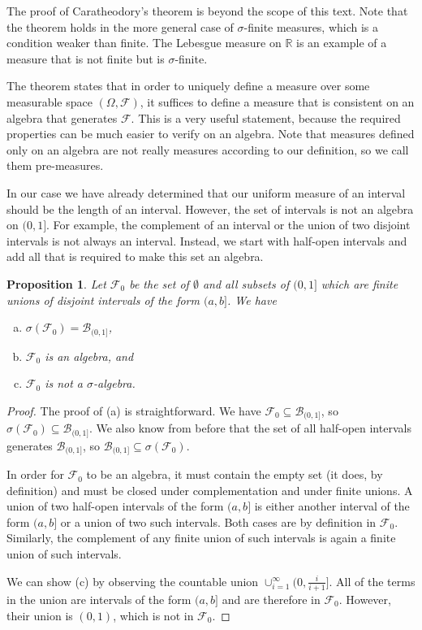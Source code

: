 \documentclass{book}
\theoremstyle{plain}%
\newtheorem{proposition}{Proposition}[section]
\theoremstyle{definition}
\begin{document}
The proof of Caratheodory's theorem is beyond the scope of this text. Note that the theorem holds in the more general case of $\sigma$-finite measures, which is a condition weaker than finite. The Lebesgue measure on $\mathbb{R}$ is an example of a measure that is not finite but is $\sigma$-finite.

The theorem states that in order to uniquely define a measure over some measurable space $(\Omega, \mathcal{F})$, it suffices to define a measure that is consistent on an algebra that generates $\mathcal{F}$. This is a very useful statement, because the required properties can be much easier to verify on an algebra. Note that measures defined only on an algebra are not really measures according to our definition, so we call them pre-measures.

In our case we have already determined that our uniform measure of an interval should be the length of an interval. However, the set of intervals is not an algebra on $(0,1]$. For example, the complement of an interval or the union of two disjoint intervals is not always an interval. Instead, we start with half-open intervals and add all that is required to make this set an algebra.

\begin{proposition} Let $\mathcal{F}_0$ be the set of $\emptyset$ and all subsets of $(0, 1]$ which are finite unions of disjoint intervals of the form $(a, b]$. We have

\begin{enumerate}[(a)]
\item $\sigma(\mathcal{F}_0) = \mathcal{B}_{(0,1]} $,
\item $\mathcal{F}_0$ is an algebra, and
\item $\mathcal{F}_0$ is not a $\sigma$-algebra.
\end{enumerate}
\end{proposition}

\begin{proof}
The proof of (a) is straightforward. We have $\mathcal{F}_0 \subseteq \mathcal{B}_{(0,1]}$, so $\sigma(\mathcal{F}_0) \subseteq \mathcal{B}_{(0,1]}$. We also know from before that the set of all half-open intervals generates $\mathcal{B}_{(0,1]}$, so $\mathcal{B}_{(0,1]} \subseteq \sigma(\mathcal{F}_0)$.

In order for $\mathcal{F}_0$ to be an algebra, it must contain the empty set (it does, by definition) and must be closed under complementation and under finite unions. A union of two half-open intervals of the form $(a, b]$ is either another interval of the form $(a, b]$ or a union of two such intervals. Both cases are by definition in $\mathcal{F}_0$. Similarly, the complement of any finite union of such intervals is again a finite union of such intervals.

We can show (c) by observing the countable union $\cup_{i=1}^\infty (0, \frac{i}{i+1}]$. All of the terms in the union are intervals of the form $(a, b]$ and are therefore in $\mathcal{F}_0$. However, their union is $(0, 1)$, which is not in $\mathcal{F}_0$.
\end{proof}
\end{document}
